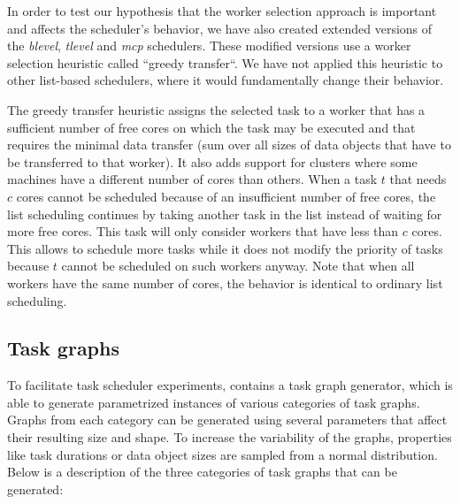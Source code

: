 In order to test our hypothesis that the worker selection approach is important and affects the
scheduler's behavior, we have also created extended versions of the \emph{blevel},
\emph{tlevel} and \emph{mcp} schedulers. These modified versions use a
worker selection heuristic called ``greedy transfer``. We have not applied this heuristic to other
list-based schedulers, where it would fundamentally change their behavior.

The greedy transfer heuristic assigns the selected task to a worker that has a sufficient number of
free cores on which the task may be executed and that requires the minimal data transfer (sum over
all sizes of data objects that have to be transferred to that worker). It also adds support for
clusters where some machines have a different number of cores than others. When a task
$t$ that needs $c$ cores cannot be scheduled because of an
insufficient number of free cores, the list scheduling continues by taking another task in the list
instead of waiting for more free cores. This task will only consider workers that have less than
$c$ cores. This allows to schedule more tasks while it does not modify the
priority of tasks because $t$ cannot be scheduled on such workers anyway. Note
that when all workers have the same number of cores, the behavior is identical to ordinary list
scheduling.

\subsection{Task graphs}
To facilitate task scheduler experiments, \estee{} contains a task graph generator,
which is able to generate parametrized instances of various categories of task graphs. Graphs from
each category can be generated using several parameters that affect their resulting size and shape.
To increase the variability of the graphs, properties like task durations or data object sizes are
sampled from a normal distribution. Below is a description of the three categories of task graphs
that can be generated:

